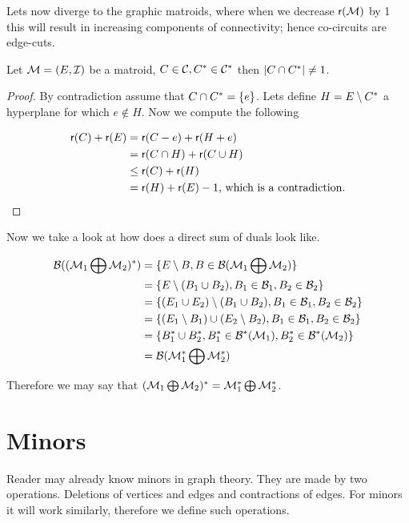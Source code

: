 Lets now diverge to the graphic matroids, where when we decrease $\operatorname{\textsf{r}}(\mathcal{M})$ by 1 this will result in increasing components of connectivity; hence co-circuits are edge-cuts.

\begin{prop}
	Let $\mathcal{M} = (E, \mathcal{I})$ be a matroid, $C \in \mathcal{C}, C^{\ast} \in \mathcal{C}^{\ast}$ then $|C \cap C^{\ast}| \neq 1$.
\end{prop}

\begin{proof}
	By contradiction assume that $C \cap C^{\ast} = \{e\}$. Lets define $H = E \setminus C^{\ast}$ a hyperplane for which $e \notin H$. Now we compute the following
	
	$$
	\begin{aligned}
		\operatorname{\textsf{r}}(C) + \operatorname{\textsf{r}}(E) &= \operatorname{\textsf{r}}(C - e) + \operatorname{\textsf{r}}(H + e) \\
		&= \operatorname{\textsf{r}}(C \cap H) + \operatorname{\textsf{r}}(C \cup H) \\
		&\leq \operatorname{\textsf{r}}(C) + \operatorname{\textsf{r}}(H) \\
		&= \operatorname{\textsf{r}}(H) + \operatorname{\textsf{r}}(E) - 1 \text{, which is a contradiction.}
	\end{aligned}
	$$
\end{proof}

Now we take a look at how does a direct sum of duals look like.

$$
\begin{aligned}
	\mathcal{B}((\mathcal{M}_1 \bigoplus \mathcal{M}_2)^{\ast}) &= \{E \setminus B, B \in \mathcal{B}(\mathcal{M}_1 \bigoplus \mathcal{M}_2)\}\\
	&= \{E \setminus (B_1 \cup B_2), B_1 \in \mathcal{B}_1, B_2 \in \mathcal{B}_2\}\\
	&= \{(E_1 \cup E_2) \setminus (B_1 \cup B_2), B_1 \in \mathcal{B}_1, B_2 \in \mathcal{B}_2\}\\
	&= \{(E_1 \setminus B_1) \cup (E_2 \setminus B_2), B_1 \in \mathcal{B}_1, B_2 \in \mathcal{B}_2\}\\
	&= \{B_1^{\ast} \cup B_2^{\ast}, B_1^{\ast} \in \mathcal{B}^{\ast}(\mathcal{M}_1), B_2^{\ast} \in \mathcal{B}^{\ast}(\mathcal{M}_2)\}\\
	&= \mathcal{B} (\mathcal{M}_1^{\ast} \bigoplus \mathcal{M}_2^{\ast})
\end{aligned}
$$

\noindent Therefore we may say that $(\mathcal{M}_1 \bigoplus \mathcal{M}_2)^{\ast} = \mathcal{M}_1^{\ast} \bigoplus \mathcal{M}_2^{\ast}$.

\section{Minors}

Reader may already know minors in graph theory. They are made by two operations. Deletions of vertices and edges and contractions of edges. For minors it will work similarly, therefore we define such operations.

